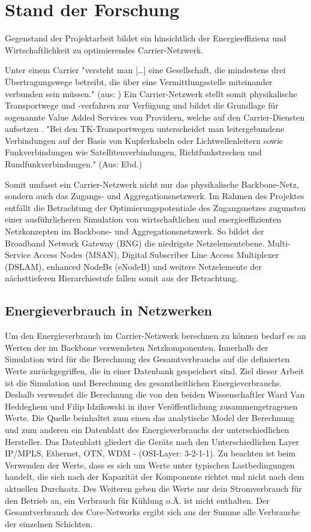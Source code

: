\documentclass[12pt,titlepage]{article}
\newcommand{\firstpages}{

     \newpage
     \tableofcontents{}
     \addtocontents{toc}{~\hfill\textbf{Seite}\par}

     \newpage
     \listoffigures

     \newpage
     \listoftables
     \newpage
}
\begin{document}
\firstpages
\section{Stand der Forschung}
Gegenstand der Projektarbeit bildet ein hinsichtlich der Energieeffizienz und Wirtschaftlichkeit zu optimierendes Carrier-Netzwerk.

Unter einem Carrier "versteht man […] eine Gesellschaft, die mindestens drei Übertra\-gungs\-wege betreibt, die über eine Vermittlungsstelle miteinander verbunden sein müssen." (aus: \cite{carrier}) Ein Carrier-Netzwerk stellt somit physikalische Transportwege und -verfahren zur Verfügung und bildet die Grundlage für sogenannte Value Added Services von Providern, welche auf den Carrier-Diensten aufsetzen \cite{fassnacht}. "Bei den TK-Transportwegen unterscheidet man leitergebundene Verbindungen auf der Basis von Kupferkabeln oder Lichtwellenleitern sowie Funkverbindungen wie Satellitenverbindungen, Richtfunkstrecken und Rundfunkverbindungen." (Aus: Ebd.)

Somit umfasst ein Carrier-Netzwerk nicht nur das physikalische Backbone-Netz, sondern auch das Zugangs- und Aggregationsnetzwerk. Im Rahmen des Projektes entfällt die Betrachtung der Optimierungspotentiale des Zugangsnetzes zugunsten einer aus\-führ\-lich\-eren Simulation von wirtschaftlichen und energieeffizienten Netzkonzepten im Backbone- und Aggregationsnetzwerk. So bildet der Broadband Network Gateway (BNG) die niedrigste Netzelementebene. Multi-Service Access Nodes (MSAN), Digital Subscriber Line Access Multiplexer (DSLAM), enhanced NodeBs (eNodeB) und weitere Netzelemente der nächsttieferen Hierarchiestufe fallen somit aus der Betrachtung.


\subsection{Energieverbrauch in Netzwerken}
Um den Energieverbrauch im Carrier-Netzwerk berechnen zu können bedarf es an Werten der im Backbone verwendeten Netzkomponenten. Innerhalb der Simulation wird für die Berechnung des Gesamtverbrauchs auf die definierten Werte zurückgegriffen, die in einer Datenbank gespeichert sind. Ziel dieser Arbeit ist die Simulation und Berechnung des gesamtheitlichen Energieverbrauchs. Deshalb verwendet die Berechnung die von den beiden Wissenschaftler Ward Van Heddeghem und Filip Idzikowski in ihrer Veröffentlichung \cite{vanhedde} zusammengetragenen Werte. Die Quelle beinhaltet zum einen das analytische Model der Berechnung und zum anderen ein Datenblatt \cite{vanhsheet} des Energieverbrauchs der unterschiedlichen Hersteller. Das Datenblatt gliedert die Geräte nach den Unterschiedlichen Layer IP/MPLS, Ethernet, OTN, WDM - (OSI-Layer: 3-2-1-1). Zu beachten ist beim Verwenden der Werte, dass es sich um Werte unter typischen Lastbedingungen handelt, die sich nach der Kapazität der Komponente richtet und nicht nach dem aktuellen Durchsatz. Des Weiteren geben die Werte nur dein Stromverbrauch für den Betrieb an, ein Verbrauch für Kühlung o.Ä. ist nicht enthalten.
Der Gesamtverbrauch des Core-Networks ergibt sich aus der Summe alle Verbrauche der einzelnen Schichten. 
\end{document}
